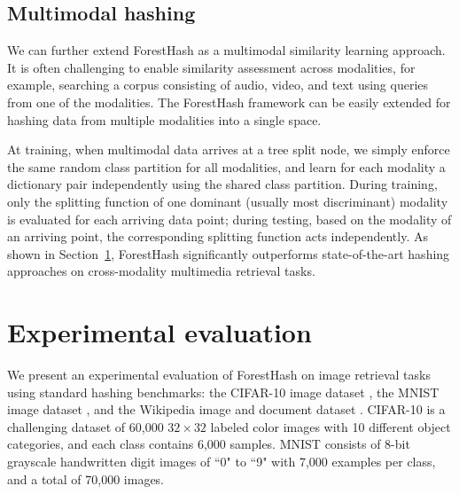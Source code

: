 \documentclass[runningheads]{llncs}
\begin{document}
\subsection{Multimodal hashing}
We can further extend ForestHash as a multimodal similarity learning approach.  It
is often challenging to enable similarity assessment across modalities, for
example, searching a corpus consisting of audio, video, and text using queries
from one of the modalities.  The ForestHash framework can be easily extended for
hashing data from multiple modalities into a single space.

At training, when multimodal data arrives at a tree split node, we simply
enforce the same random class partition for all modalities, and learn for each
modality a dictionary pair independently using the shared class partition.
During training, only the splitting function of one dominant (usually most
discriminant) modality is evaluated for each arriving data point; during
testing, based on the modality of an arriving point, the corresponding splitting
function acts independently.  As shown in Section~\ref{sec:exp}, ForestHash
significantly outperforms state-of-the-art hashing approaches on cross-modality
multimedia retrieval tasks.


\section{Experimental evaluation}
\label{sec:exp}

We present an experimental evaluation of ForestHash on image retrieval tasks
using standard hashing benchmarks: the {CIFAR-10} image dataset \cite{cifar10},
the {MNIST} image dataset \cite{MNIST}, and the Wikipedia image and document
dataset \cite{wikixmod}.  {CIFAR-10} is a challenging dataset of 60,000
$32\times32$ labeled color images with 10 different object categories, and each
class contains 6,000 samples.  {MNIST} consists of 8-bit grayscale handwritten
digit images of ``0" to ``9" with 7,000 examples per class, and a total of 70,000
images.
\end{document}

